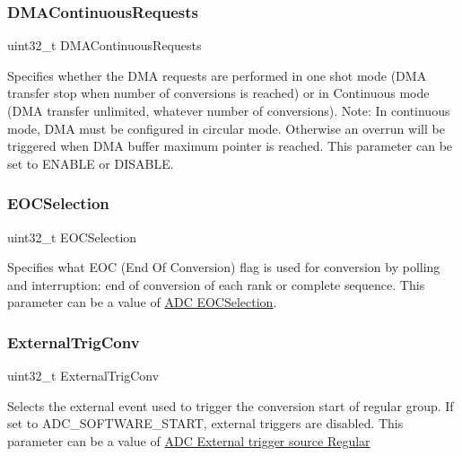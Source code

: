 \subsubsection{\texorpdfstring{D\+M\+A\+Continuous\+Requests}{DMAContinuousRequests}}
{\footnotesize\ttfamily uint32\+\_\+t D\+M\+A\+Continuous\+Requests}

Specifies whether the D\+MA requests are performed in one shot mode (D\+MA transfer stop when number of conversions is reached) or in Continuous mode (D\+MA transfer unlimited, whatever number of conversions). Note\+: In continuous mode, D\+MA must be configured in circular mode. Otherwise an overrun will be triggered when D\+MA buffer maximum pointer is reached. This parameter can be set to E\+N\+A\+B\+LE or D\+I\+S\+A\+B\+LE. \mbox{\label{struct_a_d_c___init_type_def_a92de48abe9cbd958145ce5bc090ea383}} 
\subsubsection{\texorpdfstring{E\+O\+C\+Selection}{EOCSelection}}
{\footnotesize\ttfamily uint32\+\_\+t E\+O\+C\+Selection}

Specifies what E\+OC (End Of Conversion) flag is used for conversion by polling and interruption\+: end of conversion of each rank or complete sequence. This parameter can be a value of \hyperlink{group___a_d_c___e_o_c_selection}{A\+DC E\+O\+C\+Selection}. \mbox{\label{struct_a_d_c___init_type_def_a3f4a71424165638d6621d75a351cb5e0}} 
\subsubsection{\texorpdfstring{External\+Trig\+Conv}{ExternalTrigConv}}
{\footnotesize\ttfamily uint32\+\_\+t External\+Trig\+Conv}

Selects the external event used to trigger the conversion start of regular group. If set to A\+D\+C\+\_\+\+S\+O\+F\+T\+W\+A\+R\+E\+\_\+\+S\+T\+A\+RT, external triggers are disabled. This parameter can be a value of \hyperlink{group___a_d_c___external__trigger__source___regular}{A\+DC External trigger source Regular} \mbox{\label{struct_a_d_c___init_type_def_ace2c616b80bb7f1982e8a52131a2732c}} 
